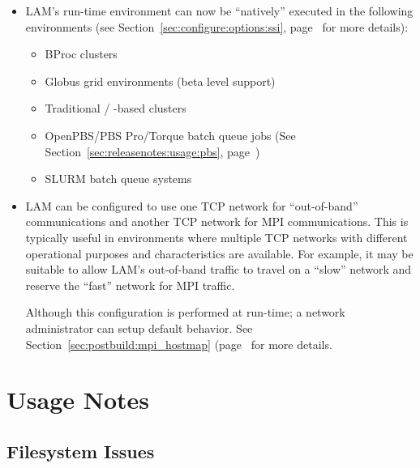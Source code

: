 \begin{itemize}
\item LAM's run-time environment can now be ``natively'' executed in
  the following environments (see
  Section~\ref{sec:configure:options:ssi},
  page~\pageref{sec:configure:options:ssi} for more details):

  \begin{itemize}
  \item BProc clusters
  \item Globus grid environments (beta level support)
  \item Traditional  / -based clusters
  \item OpenPBS/PBS Pro/Torque batch queue jobs 
        (See Section~\ref{sec:releasenotes:usage:pbs}, 
        page~\pageref{sec:releasenotes:usage:pbs})
  \item SLURM batch queue systems
  \end{itemize}


\item LAM can be configured to use one TCP network for ``out-of-band''
  communications and another TCP network for MPI communications.  This
  is typically useful in environments where multiple TCP networks with
  different operational purposes and characteristics are available.
  For example, it may be suitable to allow LAM's out-of-band traffic
  to travel on a ``slow'' network and reserve the ``fast'' network for
  MPI traffic.
  
  Although this configuration is performed at run-time; a network
  administrator can setup default behavior.  See
  Section~\ref{sec:postbuild:mpi_hostmap}
  (page~\pageref{sec:postbuild:mpi_hostmap} for more details.

\end{itemize}



\section{Usage Notes}



\subsection{Filesystem Issues}

